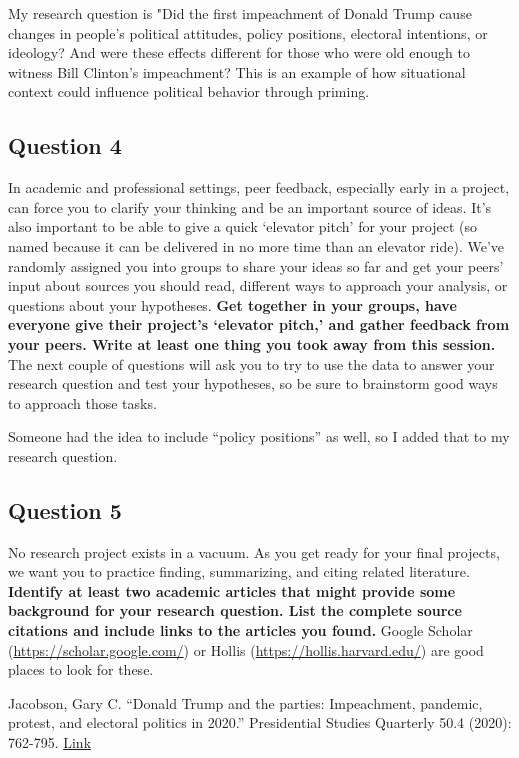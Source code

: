 \documentclass[
]{article}
\begin{document}
My research question is "Did the first impeachment of Donald Trump cause
changes in people's political attitudes, policy positions, electoral
intentions, or ideology? And were these effects different for those who
were old enough to witness Bill Clinton's impeachment? This is an
example of how situational context could influence political behavior
through priming.

\hypertarget{question-4}{%
\subsection{Question 4}\label{question-4}}

In academic and professional settings, peer feedback, especially early
in a project, can force you to clarify your thinking and be an important
source of ideas. It's also important to be able to give a quick
`elevator pitch' for your project (so named because it can be delivered
in no more time than an elevator ride). We've randomly assigned you into
groups to share your ideas so far and get your peers' input about
sources you should read, different ways to approach your analysis, or
questions about your hypotheses. \textbf{Get together in your groups,
have everyone give their project's `elevator pitch,' and gather feedback
from your peers. Write at least one thing you took away from this
session.} The next couple of questions will ask you to try to use the
data to answer your research question and test your hypotheses, so be
sure to brainstorm good ways to approach those tasks.

Someone had the idea to include ``policy positions'' as well, so I added
that to my research question.

\hypertarget{question-5}{%
\subsection{Question 5}\label{question-5}}

No research project exists in a vacuum. As you get ready for your final
projects, we want you to practice finding, summarizing, and citing
related literature. \textbf{Identify at least two academic articles that
might provide some background for your research question. List the
complete source citations and include links to the articles you found.}
Google Scholar (\url{https://scholar.google.com/}) or Hollis
(\url{https://hollis.harvard.edu/}) are good places to look for these.

Jacobson, Gary C. ``Donald Trump and the parties: Impeachment, pandemic,
protest, and electoral politics in 2020.'' Presidential Studies
Quarterly 50.4 (2020): 762-795.
\href{https://onlinelibrary.wiley.com/doi/epdf/10.1111/psq.12682}{Link}
\end{document}

